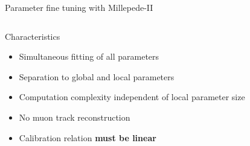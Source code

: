\documentclass{ikpKoeln}
\begin{document}
\begin{frame}[t]{Parameter fine tuning with Millepede-II}
	\vspace{-2em}
	\begin{columns}[t]
		\begin{column}{0.45 \textwidth}
			\begin{exampleblock} {Characteristics}
				\begin{itemize}
					\item Simultaneous fitting of all parameters
					\item Separation to global and local parameters
					\item Computation complexity independent of local parameter size
					\item No muon track reconstruction
					\item Calibration relation \textbf{must be linear}
				\end{itemize}
			\end{exampleblock}


\end{column}
\end{columns}
\end{frame}
\end{document}
